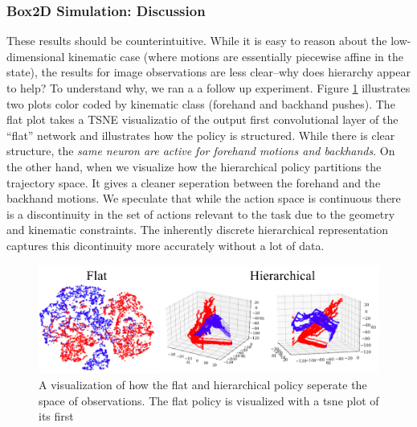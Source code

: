 \subsubsection{Box2D Simulation: Discussion}
These results should be counterintuitive. While it is easy to reason about the low-dimensional kinematic case (where motions are essentially piecewise affine in the state), the results for image observations are less clear--why does hierarchy appear to help? 
To understand why, we ran a a follow up experiment. 
Figure \ref{fig:tsne} illustrates two plots color coded by kinematic class (forehand and backhand pushes).
The flat plot takes a TSNE visualizatio of the output first convolutional layer of the ``flat'' network and illustrates how the policy is structured. 
While there is clear structure, the \emph{same neuron are active for forehand motions and backhands}. On the other hand, when we visualize how the hierarchical policy partitions the trajectory space. It gives a cleaner seperation between the forehand and the backhand motions.
We speculate that while the action space is continuous there is a discontinuity in the set of actions relevant to the task due to the geometry and kinematic constraints.
The inherently discrete hierarchical representation captures this dicontinuity more accurately without a lot of data.

\begin{figure} [ht!]
\centering
    \includegraphics[width=\textwidth]{ddco-experiments/tsne.png}
    \caption{A visualization of how the flat and hierarchical policy seperate the space of observations. The flat policy is visualized with a tsne plot of its first\label{fig:tsne}}
\end{figure}

